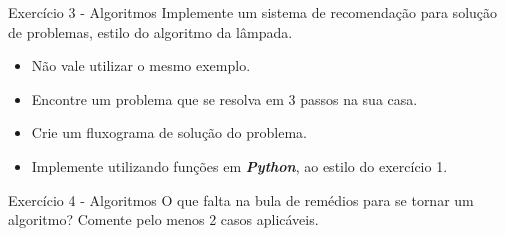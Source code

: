 \documentclass{beamer}
\begin{document}
\begin{frame}{Exercício 3 - Algoritmos}
	Implemente um sistema de recomendação para solução de problemas, estilo do algoritmo da lâmpada.
	\begin{itemize}
		\item Não vale utilizar o mesmo exemplo.
		\item Encontre um problema que se resolva em 3 passos na sua casa.
		\item Crie um fluxograma de solução do problema.
		\item Implemente utilizando funções em \textbf{\textit{Python}}, ao estilo do exercício 1.
	\end{itemize}
\end{frame}


\begin{frame}{Exercício 4 - Algoritmos}
	 O que falta na bula de remédios para se tornar um algoritmo? Comente pelo menos 2 casos aplicáveis.
\end{frame}

\backmatter
\end{document}

